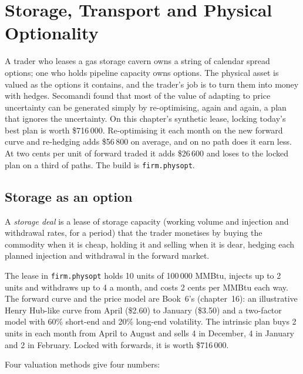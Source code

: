 \chapter{Storage, Transport and Physical Optionality}\label{ch:s2:storage-transport-and-physical-optionality}

A trader who leases a gas storage cavern owns a string of calendar spread options; one who holds pipeline capacity owns  options. The
physical asset is valued as the options it contains, and the trader's job is to turn them into money with hedges. Secomandi found that most of the
value of adapting to price uncertainty can be generated simply by re-optimising, again and again, a plan that ignores the uncertainty. On this
chapter's synthetic lease, locking today's best plan is worth \$716\,000. Re-optimising it each month on the new forward curve and re-hedging adds
\$56\,800 on average, and on no path does it earn less. At two cents per unit of forward traded it adds \$26\,600 and loses to the locked plan on a third
of paths. The build is \texttt{firm.physopt}.

\section{Storage as an option}

\begin{definition}\label{def:s2:storage-transport-and-physical-optionality:storage}
A \emph{storage deal} is a lease of storage capacity (working volume and injection and withdrawal rates, for a period) that the
trader monetises by buying the commodity when it is cheap, holding it and selling when it is dear, hedging each planned injection and withdrawal in the
forward market.
\end{definition}

The lease in \texttt{firm.physopt} holds 10 units of 100\,000 MMBtu, injects up to 2 units and withdraws up to 4 a month, and costs 2 cents per MMBtu
each way. The forward curve and the price model are Book~6's (chapter~16): an illustrative Henry Hub-like curve from April (\$2.60) to January
(\$3.50) and a two-factor model with 60\% short-end and 20\% long-end volatility. The intrinsic plan buys 2 units in each month from April to August
and sells 4 in December, 4 in January and 2 in February. Locked with forwards, it is worth \$716\,000.

Four valuation methods give four numbers:

